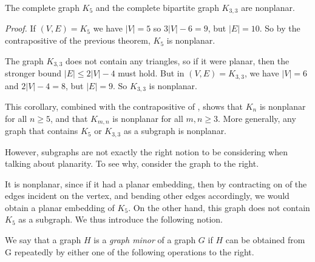 \documentclass{tufte-handout}
\begin{document}
\begin{Corollary}
    The complete graph \( K_5 \) and the complete bipartite graph \( K_{3,3} \) are nonplanar.
\end{Corollary}

\textit{Proof.} If \((V,E) = K_5\) we have \( \left|V\right| = 5 \) so \( 3 \left|V\right| - 6 = 9 \), but
\( \left|E\right| = 10 \). So by the contrapositive of the previous theorem, \( K_5 \) is nonplanar.

The graph \( K_{3,3} \) does not contain any triangles, so if it were planar, then the stronger bound
\( \left|E\right| \leq 2\left|V\right| - 4 \) must hold. But in \((V,E) = K_{3,3}\), we have
\( \left|V\right| = 6 \) and \( 2\left|V\right| - 4 = 8 \), but \( \left|E\right| = 9 \). So \( K_{3,3} \) is nonplanar. \qedsymbol

This corollary, combined with the contrapositive of , shows that \( K_n \) is nonplanar
for all \( n \geq 5 \), and that \( K_{m,n} \) is nonplanar for all \( m,n \geq 3 \). More generally, any graph
that contains \( K_5 \) or \( K_{3,3} \) as a subgraph is nonplanar.

However, subgraphs are not exactly the right notion to be considering when talking about planarity.
To see why, consider the graph to the right.

It is nonplanar, since if it had a planar embedding, then by contracting on of the edges incident on the vertex,
and bending other edges accordingly, we would obtain a planar embedding of \( K_5 \). On the other hand,
this graph does not contain \( K_5 \) as a subgraph. We thus introduce the following notion.

We say that a graph \( H \) is a \textit{graph minor} of a graph \( G \) if \( H \) can be obtained from G repeatedly by either
one of the following operations to the right.
\end{document}
